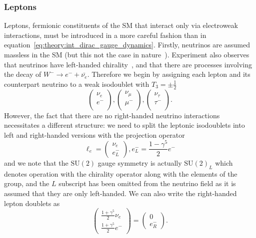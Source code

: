 \subsubsection{Leptons}
Leptons, fermionic constituents of the SM that interact only via electroweak interactions, must be introduced in a more careful fashion than in equation~\ref{eq:theory:int_dirac_gauge_dynamics}. 
Firstly, neutrinos are assumed massless in the SM (but this not the case in nature~\cite{NeutrinoOscillation}).
Experiment also observes that neutrinos have left-handed chirality~\cite{NeutrinoChirality}, and that there are processes involving the decay of $W^{-}\rightarrow{}e^{-}+\bar{\nu_{e}}$. 
Therefore we begin by assigning each lepton and its counterpart neutrino to a weak isodoublet with $T_{3} = \pm\frac{1}{2}$ 
\begin{equation}
    \label{eq:theory:lepton_isodoublets}
    \begin{pmatrix}
        \nu_{e} \\
        e^{-} \\
    \end{pmatrix},
    \begin{pmatrix}
        \nu_{\mu} \\
        \mu^{-} \\
    \end{pmatrix},
    \begin{pmatrix}
        \nu_{\tau} \\
        \tau^{-} \\
    \end{pmatrix}.
\end{equation}
However, the fact that there are no right-handed neutrino interactions necessitates a different structure: we need to split the leptonic isodoublets into left and right-handed versions with the projection operator
\begin{equation}
    \ell_{e} =\begin{pmatrix}
        \nu_{e} \\
        e_{L}^{-}
    \end{pmatrix},
    e^{-}_{L} = \frac{1-\gamma^{5}}{2}e^{-}
\end{equation}
and we note that the $\mathrm{SU}(2)$ gauge symmetry is actually $\mathrm{SU}(2)_{L}$ which denotes operation with the chirality operator along with the elements of the group, and the $L$ subscript has been omitted from the neutrino field as it is assumed that they are only left-handed. 
We can also write the right-handed lepton doublets as
\begin{equation}
    \label{eq:theory:right_handed_leptons}
    \begin{pmatrix}
        \frac{1+\gamma^{5}}{2}\nu_{e} \\
        \frac{1+\gamma^{5}}{2}e^{-}
    \end{pmatrix}=\begin{pmatrix}
        0 \\
        e_{R}^{-}
    \end{pmatrix}.
\end{equation}
